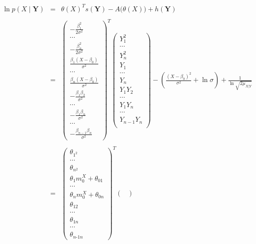 \documentclass[11pt, oneside]{article}   	%
\numberwithin{figure}{section}
\numberwithin{equation}{section}
\numberwithin{table}{section}
\begin{document}
\begin{itemize}
\begin{eqnarray*}
\ln p(X\mid \mathbf{Y}) &=& \theta(X)^T s(\mathbf{Y}) - A \big(\theta(X) \big) + h(\mathbf{Y})\\\\
&=&
\begin{pmatrix}
-\frac{\beta_1^2}{2\sigma^2}\\
\cdots\\
-\frac{\beta_n^2}{2\sigma^2}\\
\frac{\beta_1(X-\beta_0)}{\sigma^2}\\
\cdots\\
\frac{\beta_n(X-\beta_0)}{\sigma^2}\\
-\frac{\beta_1\beta_2}{\sigma^2}\\
\cdots\\
-\frac{\beta_1\beta_n}{\sigma^2}\\
\cdots\\
-\frac{\beta_{n-1}\beta_n}{\sigma^2}
\end{pmatrix}^T
\begin{pmatrix}
Y_1^2\\
\cdots\\
Y_n^2\\
Y_1\\
\cdots\\
Y_n\\
Y_1 Y_2\\
\cdots\\
Y_1 Y_n\\
\cdots\\
Y_{n-1}Y_{n}\\
\end{pmatrix}
- \left( \frac{(X-\beta_0)^2}{\sigma^2} + \ln{\sigma} \right) + \frac{1}{\ln{\sqrt{2\mu_{X|Y}}}}\\\\
&=&
\begin{pmatrix}
\theta_{1^2}\\
\cdots\\
\theta_{n^2}\\
\theta_1 m_0^X+\theta_{01}\\
\cdots\\
\theta_n m_0^X+\theta_{0n}\\
\theta_{12}\\
\cdots\\
\theta_{1n}\\
\cdots\\
\theta_{n\mbox{-}1n}
\end{pmatrix}^T
\begin{pmatrix}

\end{pmatrix}
\end{eqnarray*}
\end{itemize}
\end{document}
